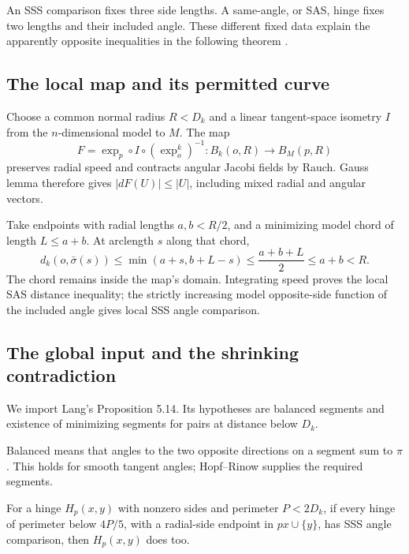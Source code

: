 \documentclass[12pt,reqno]{amsart}
\begin{document}
An SSS comparison fixes three side lengths. A same-angle, or SAS, hinge fixes two lengths and their included angle. These different fixed data explain the apparently opposite inequalities in the following theorem \cite{S-Lang-2026,S-Toponogov-1959}.

\begin{samepage}
\begin{theorem}[Toponogov]
\label{thm:toponogov}

\end{theorem}
\end{samepage}

\subsection*{The local map and its permitted curve}
Choose a common normal radius \(R<D_k\) and a linear tangent-space isometry \(I\) from the \(n\)-dimensional model to \(M\). The map
\[
F=\exp_p\circ I\circ(\exp_o^k)^{-1}:B_k(o,R)\longrightarrow B_M(p,R)
\]
preserves radial speed and contracts angular Jacobi fields by Rauch. Gauss lemma therefore gives \(|dF(U)|\le|U|\), including mixed radial and angular vectors.

Take endpoints with radial lengths \(a,b<R/2\), and a minimizing model chord of length \(L\le a+b\). At arclength \(s\) along that chord,
\[
d_k(o,\bar\sigma(s))\le\min(a+s,b+L-s)
\le\frac{a+b+L}{2}\le a+b<R.
\]
The chord remains inside the map's domain. Integrating speed proves the local SAS distance inequality; the strictly increasing model opposite-side function of the included angle gives local SSS angle comparison.

\subsection*{The global input and the shrinking contradiction}
We import Lang's Proposition 5.14. Its hypotheses are balanced segments and existence of minimizing segments for pairs at distance below \(D_k\).

Balanced means that angles to the two opposite directions on a segment sum to \(\pi\). This holds for smooth tangent angles; Hopf--Rinow supplies the required segments.

For a hinge \(H_p(x,y)\) with nonzero sides and perimeter \(P<2D_k\), if every hinge of perimeter below \(4P/5\), with a radial-side endpoint in \(px\cup\{y\}\), has SSS angle comparison, then \(H_p(x,y)\) does too.
\end{document}

